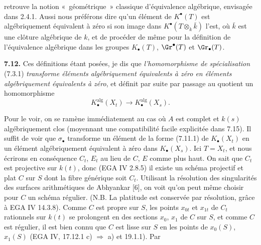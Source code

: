 
retrouve la notion «~géométrique~» classique d'équivalence algébrique, envisagée dans 2.4.1. Aussi nous préférons dire qu'un élément de \(K^\bullet(T)\) est algébriquement équivalent à zéro si son image dans \(K^\bullet(T\otimes_k\bar k)\) l'est, où \(\bar k\) est une clôture algébrique de \(k\), et de procéder de même pour la définition de l'équivalence algébrique dans les groupes \(K_\bullet(T)\), \(\Gr^\bullet(T)\) et \(\Gr_\bullet(T)\).

\textbf{7.12.} Ces définitions étant posées, je dis que \emph{l'homomorphisme de spécialisation} (7.3.1) \emph{transforme éléments algébriquement équivalents à zéro en éléments algébriquement équivalents à zéro}, et définit par suite par passage au quotient un homomorphisme
\begin{equation}\tag{7.12.1}
  K_\bullet^{\mathrm{alg}}(X_t)\longrightarrow K_\bullet^{\mathrm{alg}}(X_s).
\end{equation}

Pour le voir, on se ramène immédiatement au cas où \(A\) est complet et \(k(s)\) algébriquement clos (moyennant une compatibilité facile explicitée dans 7.15). Il suffit de voir que \(\sigma_\bullet\) transforme un élément de la forme (7.11.1) de \(K_\bullet(X_t)\) en un élément algébriquement équivalent à zéro dans \(K_\bullet(X_s)\). Ici \(T=X_t\), et nous écrirons en conséquence \(C_t\), \(E_t\) au lieu de \(C\), \(E\) comme plus haut. On sait que \(C_t\) est projective sur \(k(t)\), donc (EGA IV 2.8.5) il existe un schéma projectif et plat \(C\) sur \(S\) dont la fibre générique soit \(C_t\). Utilisant la résolution des singularités des surfaces arithmétiques de Abhyankar [6], on voit qu'on peut même choisir pour \(C\) un schéma régulier. (N.B. La platitude est conservée par résolution, grâce à EGA IV 14.3.8). Comme \(C\) est propre sur \(S\), les points \(x_{0t}\) et \(x_{1t}\) de \(C_t\) rationnels sur \(k(t)\) se prolongent en des sections \(x_0\), \(x_1\) de \(C\) sur \(S\), et comme \(C\) est régulier, il est bien connu que \(C\) est lisse sur \(S\) en les points de \(x_0(S)\), \(x_1(S)\) (EGA IV, 17.12.1 c) \(\Rightarrow\) a) et 19.1.1). Par
